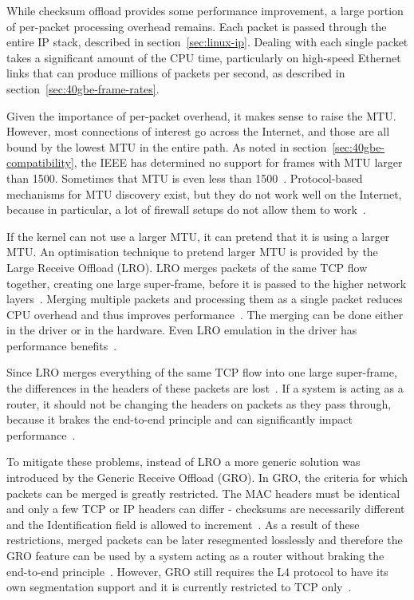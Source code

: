 While checksum offload provides some performance improvement,
a large portion of per-packet processing overhead remains.
Each packet is passed through the entire IP stack, described in section~\ref{sec:linux-ip}.
Dealing with each single packet takes a significant amount of the CPU time, particularly on high-speed Ethernet links that
can produce millions of packets per second, as described in section~\ref{sec:40gbe-frame-rates}.

Given the importance of per-packet overhead, it makes sense to raise the MTU.
However, most connections of interest go across the Internet,
and those are all bound by the lowest MTU in the entire path.
As noted in section~\ref{sec:40gbe-compatibility}, the IEEE has determined no support for frames with MTU larger than 1500.
Sometimes that MTU is even less than 1500~\cite{jls2009-gro}.
Protocol-based mechanisms for MTU discovery exist, but they do not work well on the Internet,
because in particular, a lot of firewall setups do not allow them to work~\cite{jls2009-gro}.

If the kernel can not use a larger MTU, it can pretend that it is using a larger MTU.
An optimisation technique to pretend larger MTU is provided by the Large Receive Offload (LRO).
LRO merges packets of the same TCP flow together,
creating one large super-frame, before it is passed to the higher network layers~\cite{jls2009-gro}.
Merging multiple packets and processing them as a single packet
reduces CPU overhead and thus improves performance~\cite{linux-kernel-networking}.
The merging can be done either in the driver or in the hardware.
Even LRO emulation in the driver has performance benefits~\cite{jls2009-gro}.

Since LRO merges everything of the same TCP flow into one large super-frame,
the differences in the headers of these packets are lost~\cite{jls2009-gro}.
If a system is acting as a router, it should not be changing the headers on packets as they pass through,
because it brakes the end-to-end principle and can significantly impact performance~\cite{linux-kernel-networking}.

To mitigate these problems, instead of LRO a more generic solution
was introduced by the Generic Receive Offload (GRO).
In GRO, the criteria for which packets can be merged is greatly restricted.
The MAC headers must be identical and only a few TCP or IP headers can differ -
checksums are necessarily different and the Identification field is allowed to increment~\cite{jls2009-gro}.
As a result of these restrictions, merged packets can be later resegmented losslessly
and therefore the GRO feature can be used by a system acting as a router without braking the end-to-end principle~\cite{jls2009-gro}.
However, GRO still requires the L4 protocol to have its own segmentation support
and it is currently restricted to TCP only~\cite{linux-kernel-networking}.

